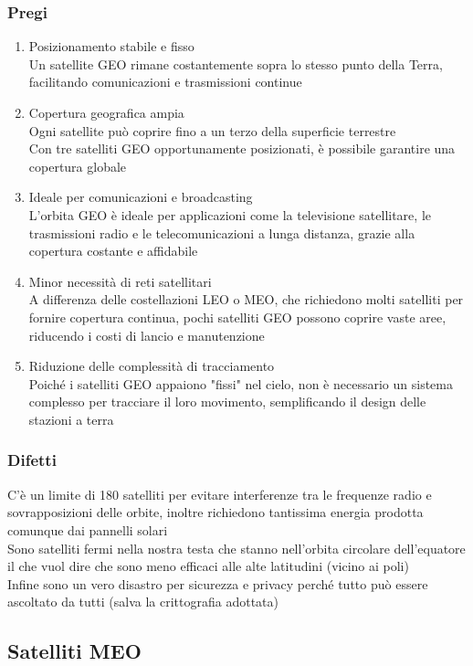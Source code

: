 \documentclass[10pt,oneside,a4paper]{article}
\begin{document}
\subsubsection{Pregi}
\begin{enumerate}
\item Posizionamento stabile e fisso\\
Un satellite GEO rimane costantemente sopra lo stesso punto della Terra, facilitando comunicazioni e trasmissioni continue
\item Copertura geografica ampia\\
Ogni satellite può coprire fino a un terzo della superficie terrestre\\
Con tre satelliti GEO opportunamente posizionati, è possibile garantire una copertura globale 
\item Ideale per comunicazioni e broadcasting\\
L'orbita GEO è ideale per applicazioni come la televisione satellitare, le trasmissioni radio e le telecomunicazioni a lunga distanza, grazie alla copertura costante e affidabile
\item Minor necessità di reti satellitari\\
A differenza delle costellazioni LEO o MEO, che richiedono molti satelliti per fornire copertura continua, pochi satelliti GEO possono coprire vaste aree, riducendo i costi di lancio e manutenzione
\item Riduzione delle complessità di tracciamento\\
Poiché i satelliti GEO appaiono "fissi" nel cielo, non è necessario un sistema complesso per tracciare il loro movimento, semplificando il design delle stazioni a terra
\end{enumerate}
\subsubsection{Difetti}
C'è un limite di 180 satelliti per evitare interferenze tra le frequenze radio e sovrapposizioni delle orbite, inoltre richiedono tantissima energia prodotta comunque dai pannelli solari\\
Sono satelliti fermi nella nostra testa che stanno nell'orbita circolare dell'equatore il che vuol dire che sono meno efficaci alle alte latitudini (vicino ai poli)\\
Infine sono un vero disastro per sicurezza e privacy perché tutto può essere ascoltato da tutti (salva la crittografia adottata)
\subsection{Satelliti MEO}
\end{document}
